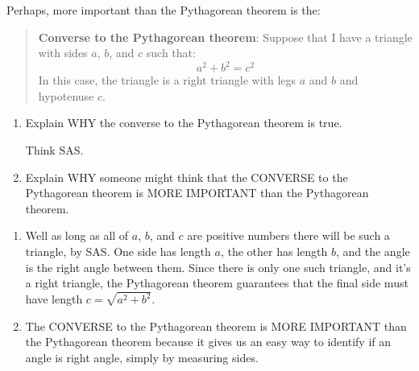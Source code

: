 \documentclass[noauthor,nooutcomes,handout,hints]{ximera}
\begin{document}
\begin{question}
  Perhaps, more important than the Pythagorean theorem is the:
  \begin{quote}
    \textbf{Converse to the Pythagorean theorem}: Suppose that I have
    a triangle with sides $a$, $b$, and $c$ such that:
    \[
    a^2 + b^2 = c^2
    \]
    In this case, the triangle is a right triangle with legs $a$ and
    $b$ and hypotenuse $c$.
  \end{quote}
  \begin{enumerate}
  \item Explain WHY the converse to the Pythagorean theorem is true.
    \begin{hint}
      Think SAS. 
    \end{hint}
  \item Explain WHY someone might think that the CONVERSE to the
    Pythagorean theorem is MORE IMPORTANT than the Pythagorean
    theorem.
  \end{enumerate}
    \begin{freeResponse}
      \begin{enumerate}
      \item Well as long as all of $a$, $b$, and $c$ are positive numbers there
        will be such a triangle, by SAS.  One side has length $a$, the
        other has length $b$, and the angle is the right angle between
        them. Since there is only one such triangle, and it's a right
        triangle, the Pythagorean theorem guarantees that the final side
        must have length $c = \sqrt{a^2+b^2}$.
      \item The CONVERSE to the Pythagorean theorem is MORE IMPORTANT
        than the Pythagorean theorem because it gives us an easy way
        to identify if an angle is right angle, simply by measuring
        sides.
      \end{enumerate}
      \end{freeResponse}
  
\end{question}
\end{document}
